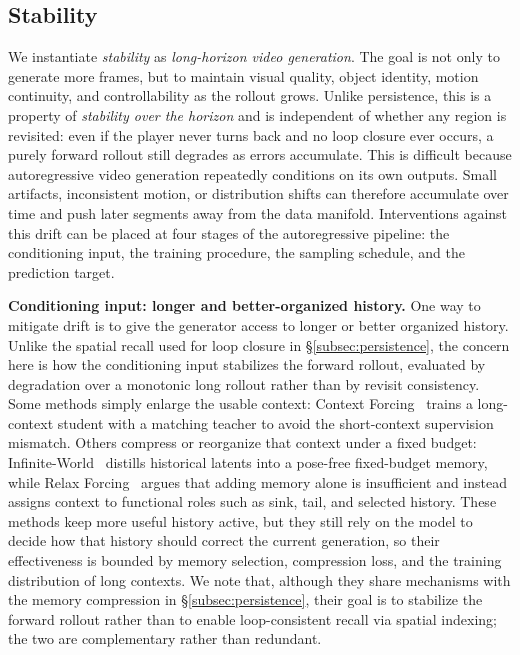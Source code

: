 \subsection{Stability}
\label{subsec:durability}

We instantiate \textit{stability} as \textit{long-horizon video generation}.
The goal is not only to generate more frames, but to maintain visual quality, object identity, motion continuity, and controllability as the rollout grows.
Unlike persistence, this is a property of \emph{stability over the horizon} and is independent of whether any region is revisited: even if the player never turns back and no loop closure ever occurs, a purely forward rollout still degrades as errors accumulate.
This is difficult because autoregressive video generation repeatedly conditions on its own outputs.
Small artifacts, inconsistent motion, or distribution shifts can therefore accumulate over time and push later segments away from the data manifold.
Interventions against this drift can be placed at four stages of the autoregressive pipeline: the conditioning input, the training procedure, the sampling schedule, and the prediction target.

\textbf{Conditioning input: longer and better-organized history.}
One way to mitigate drift is to give the generator access to longer or better organized history.
Unlike the spatial recall used for loop closure in \S\ref{subsec:persistence}, the concern here is how the conditioning input stabilizes the forward rollout, evaluated by degradation over a monotonic long rollout rather than by revisit consistency.
Some methods simply enlarge the usable context: Context Forcing~\cite{chen2026context} trains a long-context student with a matching teacher to avoid the short-context supervision mismatch.
Others compress or reorganize that context under a fixed budget: Infinite-World~\cite{wu2026infiniteworld} distills historical latents into a pose-free fixed-budget memory, while Relax Forcing~\cite{zhao2026relaxforcing} argues that adding memory alone is insufficient and instead assigns context to functional roles such as sink, tail, and selected history.
These methods keep more useful history active, but they still rely on the model to decide how that history should correct the current generation, so their effectiveness is bounded by memory selection, compression loss, and the training distribution of long contexts.
We note that, although they share mechanisms with the memory compression in \S\ref{subsec:persistence}, their goal is to stabilize the forward rollout rather than to enable loop-consistent recall via spatial indexing; the two are complementary rather than redundant.

